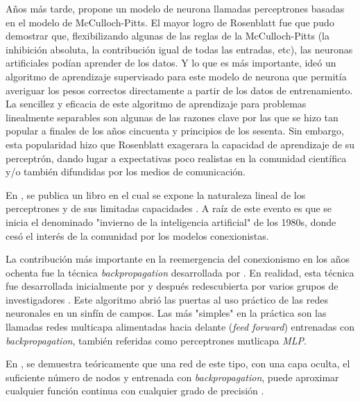 Años más tarde, \cite{rosenblatt1958perceptron} propone un modelo de neurona llamadas perceptrones basadas en el modelo
de McCulloch-Pitts. El mayor logro de Rosenblatt fue que pudo demostrar que, flexibilizando algunas de las reglas de la
McCulloch-Pitts (la inhibición absoluta, la contribución igual de todas las entradas, etc), las neuronas artificiales
podían aprender de los datos. Y lo que es más importante, ideó un algoritmo de aprendizaje supervisado para este modelo
de neurona que permitía averiguar los pesos correctos directamente a partir de los datos de entrenamiento. La sencillez
y eficacia de este algoritmo de aprendizaje para problemas linealmente separables son algunas de las razones clave por
las que se hizo tan popular a finales de los años cincuenta y principios de los sesenta. Sin embargo, esta popularidad
hizo que Rosenblatt exagerara la capacidad de aprendizaje de su perceptrón, dando lugar a expectativas poco realistas
en la comunidad científica y/o también difundidas por los medios de comunicación.

En \citeyear{minsky1969perceptrons}, se publica un libro en el cual se expone la naturaleza lineal de los perceptrones
y de sus limitadas capacidades \parencite{minsky1969perceptrons}. A raíz de este evento es que se inicia el denominado "invierno de la inteligencia
artificial" de los 1980s, donde cesó el interés de la comunidad por los modelos conexionistas.

La contribución más importante en la reemergencia del conexionismo en los años ochenta fue la técnica {\it
backpropagation} desarrollada por \cite{rumelhart1986learning}. En realidad, esta técnica fue desarrollada inicialmente
por \cite{werbos1974beyond} y después redescubierta por varios grupos de investigadores \parencite{lecun1985learning, rumelhart1986learning}. Este algoritmo abrió las puertas al uso práctico de las redes
neuronales en un sinfín de campos. Las más "simples" en la práctica son las llamadas redes multicapa alimentadas hacia
delante ({\it feed forward}) entrenadas con {\it backpropagation}, también referidas como perceptrones mutlicapa {\it
        MLP}.

En \citeyear{funahashi1989approximate}, se demuestra teóricamente que una red de este tipo, con una capa oculta, el
suficiente número de nodos y entrenada con {\it backpropagation}, puede aproximar cualquier función continua con
cualquier grado de precisión \parencite{funahashi1989approximate}.

